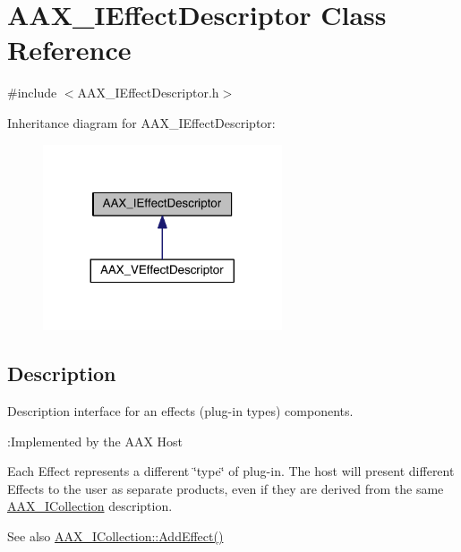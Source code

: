 \hypertarget{a00096}{}\section{A\+A\+X\+\_\+\+I\+Effect\+Descriptor Class Reference}
\label{a00096}


{\ttfamily \#include $<$A\+A\+X\+\_\+\+I\+Effect\+Descriptor.\+h$>$}



Inheritance diagram for A\+A\+X\+\_\+\+I\+Effect\+Descriptor\+:
\nopagebreak
\begin{figure}[H]
\begin{center}
\leavevmode
\includegraphics[width=200pt]{a00622}
\end{center}
\end{figure}


\subsection{Description}
Description interface for an effect\textquotesingle{}s (plug-\/in type\textquotesingle{}s) components. 

\begin{DoxyRefDesc}{\+:\+Implemented by the A\+A\+X Host}
\item[\hyperlink{a00001__aax_host_implementation000006}{\+:\+Implemented by the A\+A\+X Host}]\end{DoxyRefDesc}


Each Effect represents a different \char`\"{}type\char`\"{} of plug-\/in. The host will present different Effects to the user as separate products, even if they are derived from the same \hyperlink{a00087}{A\+A\+X\+\_\+\+I\+Collection} description.

\begin{DoxySeeAlso}{See also}
\hyperlink{a00087_a5ff114b8c4da2081515186f2faf65c8c}{A\+A\+X\+\_\+\+I\+Collection\+::\+Add\+Effect()} 
\end{DoxySeeAlso}
